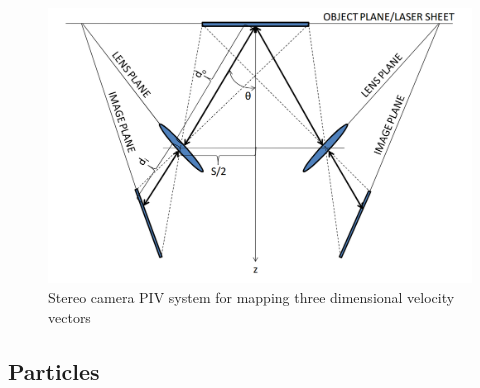\vspace{32pt}
\begin{figure}[H]
	\centering
	\includegraphics[width=5in]{figs/piv_method/stereo_piv_optics}
	\caption{Stereo camera PIV system for mapping three dimensional velocity 
		vectors}
	\label{fig:stereo_piv}
\end{figure}  
\vspace{16pt}

\subsection{Particles}

